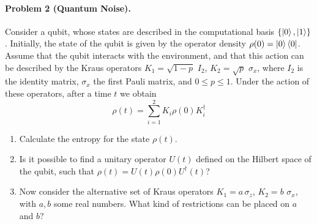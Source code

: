 \documentclass[catalan,spanish,english]{exam}
\begin{document}
\paragraph{Problem 2 (Quantum Noise).}
Consider a qubit, whose states are described in the computational
basis $\{\left|0\right\rangle,\left|1\right\rangle\}$. Initially, the state of the qubit is given
by the operator density $\rho(0)=\left|0\right\rangle\left\langle 0\right|$. Assume that the qubit
interacts with the environment, and that this action can be described
by the Kraus operators $K_{1}=\sqrt{1-p}\,\,I_{2}$, $K_{2}=\sqrt{p}\,\,\sigma_{x}$,
where $I_{2}$ is the identity matrix, $\sigma_{x}$ the first Pauli
matrix, and $0\le p\le1$. Under the action of these operators, after
a time $t$ we obtain\foreignlanguage{spanish}{
\[
\rho(t)=\sum_{i=1}^{2}K_{i}\rho(0)K_{i}^{\dagger}
\]
}

\begin{enumerate}
    \item Calculate the entropy for the state $\rho(t)$. 
    \item Is it possible to
find a unitary operator $U(t)$ defined on the Hilbert space of the
qubit, such that $\rho(t)=U(t)\rho(0)U^{\dagger}(t)$? 

\item Now consider the alternative set of Kraus operators $K_{1}=a\,\sigma_{z}$,
$K_{2}=b\,\,\sigma_{x}$, with $a,b$ some real numbers. What kind
of restrictions can be placed on $a$ and $b$?
\end{enumerate}
\end{document}
